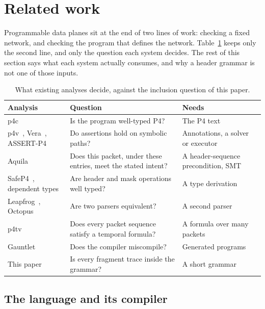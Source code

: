 \documentclass[a4paper,UKenglish,cleveref,autoref]{lipics-v2021}
\begin{document}
\section{Related work}
\label{sec:related}

Programmable data planes sit at the end of two lines of work: checking a fixed network, and checking the program that defines the network.
Table~\ref{tab:rel} keeps only the second line, and only the question each system decides.
The rest of this section says what each system actually consumes, and why a header grammar is not one of those inputs.

\begin{table}[t]
\caption{What existing analyses decide, against the inclusion question of this paper.}
\label{tab:rel}
\begin{tabular}{p{}p{}p{}}
\hline
Analysis & Question & Needs \\
\hline
p4c~\cite{p4c} & Is the program well-typed P4? & The P4 text \\
p4v~\cite{p4v}, Vera~\cite{vera}, ASSERT-P4~\cite{assertp4} & Do assertions hold on symbolic paths? & Annotations, a solver or executor \\
Aquila~\cite{aquila} & Does this packet, under these entries, meet the stated intent? & A header-sequence precondition, SMT \\
SafeP4~\cite{safep4}, dependent types~\cite{depp4} & Are header and mask operations well typed? & A type derivation \\
Leapfrog~\cite{leapfrog}, Octopus~\cite{octopus} & Are two parsers equivalent? & A second parser \\
p4tv~\cite{p4ltl} & Does every packet sequence satisfy a temporal formula? & A formula over many packets \\
Gauntlet~\cite{gauntlet} & Does the compiler miscompile? & Generated programs \\
This paper & Is every fragment trace inside the grammar? & A short grammar \\
\hline
\end{tabular}
\end{table}

\subsection{The language and its compiler}
\end{document}
